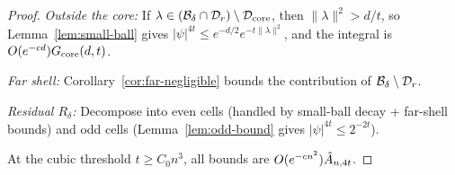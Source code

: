 \begin{proof}\leanok
{}
\emph{Outside the core:}
If $\lambda\in(\mathcal{B}_\delta\cap\mathcal{D}_r)\setminus\mathcal{D}_\mathrm{core}$, then
$\|\lambda\|^2>d/t$, so Lemma~\ref{lem:small-ball} gives
$|\psi|^{4t}\le e^{-d/2}e^{-t\|\lambda\|^2}$, and the integral is
$O(e^{-cd})G_{\mathrm{core}}(d,t)$.

\emph{Far shell:}
Corollary~\ref{cor:far-negligible} bounds the contribution of
$\mathcal{B}_\delta\setminus\mathcal{D}_r$.

\emph{Residual $R_\delta$:}
Decompose into even cells (handled by small-ball decay + far-shell
bounds) and odd cells (Lemma~\ref{lem:odd-bound} gives
$|\psi|^{4t}\le 2^{-2t}$).

At the cubic threshold $t\ge C_0 n^3$, all bounds are $O(e^{-cn^2})\hat A_{n,4t}$.
\end{proof}

